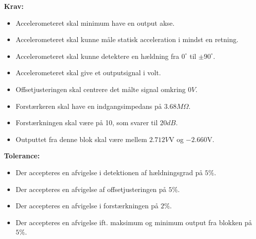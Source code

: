 \noindent\textbf{Krav:}
\begin{itemize}
	\item Accelerometeret skal minimum have en output akse.%
	\item Accelerometeret skal kunne måle statisk acceleration i mindst en retning.
	\item Accelerometeret skal kunne detektere en hældning fra $0^{\circ}$ til $\pm90^{\circ}$.
	\item Accelerometeret skal give et outputsignal i volt.
	\item Offsetjusteringen skal centrere det målte signal omkring $0V$.
	\item Forstærkeren skal have en indgangsimpedans på $3.68M\Omega$.
	\item Forstærkningen skal være på 10, som svarer til $20dB$.
	\item Outputtet fra denne blok skal være mellem $2.712V$V og $-2.660$V.
\end{itemize}
\textbf{Tolerance:}
\begin{itemize}
	\item Der accepteres en afvigelse i detektionen af hældningsgrad på $5\%$.
	\item Der accepteres en afvigelse af offsetjusteringen på $5\%$.
	\item Der accepteres en afvigelse i forstærkningen på $2\%$.
	\item Der accepteres en afvigelse ift. maksimum og minimum output fra blokken på $5\%$.
\end{itemize}
